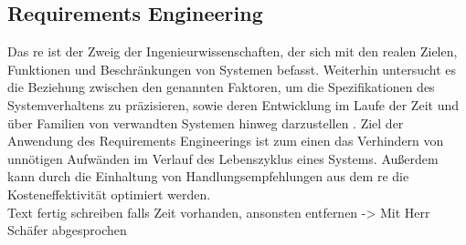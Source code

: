 \documentclass[../../../Bachelorarbeit.tex]{subfiles}
\begin{document}
 

\subsection{Requirements Engineering}
Das \ac{re} ist der Zweig der Ingenieurwissenschaften, der sich mit den realen Zielen, Funktionen und Beschränkungen von Systemen befasst. Weiterhin untersucht es die Beziehung zwischen den genannten Faktoren, um die Spezifikationen des Systemverhaltens zu präzisieren, sowie deren Entwicklung im Laufe der Zeit und über Familien von verwandten Systemen hinweg darzustellen \cite[2-3]{Laplante2014}. Ziel der Anwendung des Requirements Engineerings ist zum einen das Verhindern von unnötigen Aufwänden im Verlauf des Lebenszyklus eines Systems. Außerdem kann durch die Einhaltung von Handlungsempfehlungen aus dem \acs{re} die Kosteneffektivität optimiert werden.\\

\color{red}
Text fertig schreiben falls Zeit vorhanden, ansonsten entfernen -> Mit Herr Schäfer abgesprochen
\end{document}
